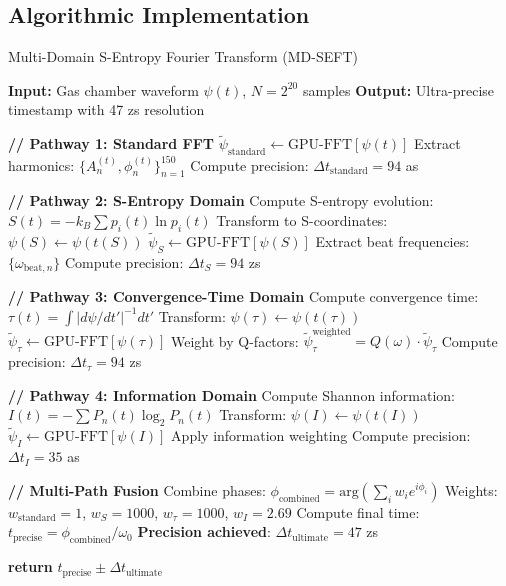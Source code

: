 \documentclass[12pt,a4paper]{article}
\begin{document}
\subsection{Algorithmic Implementation}

\begin{algorithm}[H]
\caption{Multi-Domain S-Entropy Fourier Transform (MD-SEFT)}
\begin{algorithmic}[1]
\State \textbf{Input:} Gas chamber waveform $\psi(t)$, $N = 2^{20}$ samples
\State \textbf{Output:} Ultra-precise timestamp with 47 zs resolution

\State \textbf{// Pathway 1: Standard FFT}
\State $\tilde{\psi}_{\text{standard}} \gets \text{GPU-FFT}[\psi(t)]$
\State Extract harmonics: $\{A_n^{(t)}, \phi_n^{(t)}\}_{n=1}^{150}$
\State Compute precision: $\Delta t_{\text{standard}} = 94$ as

\State \textbf{// Pathway 2: S-Entropy Domain}
\State Compute S-entropy evolution: $S(t) = -k_B \sum p_i(t) \ln p_i(t)$
\State Transform to S-coordinates: $\psi(S) \gets \psi(t(S))$
\State $\tilde{\psi}_S \gets \text{GPU-FFT}[\psi(S)]$
\State Extract beat frequencies: $\{\omega_{\text{beat},n}\}$
\State Compute precision: $\Delta t_S = 94$ zs

\State \textbf{// Pathway 3: Convergence-Time Domain}
\State Compute convergence time: $\tau(t) = \int |d\psi/dt'|^{-1} dt'$
\State Transform: $\psi(\tau) \gets \psi(t(\tau))$
\State $\tilde{\psi}_{\tau} \gets \text{GPU-FFT}[\psi(\tau)]$
\State Weight by Q-factors: $\tilde{\psi}_{\tau}^{\text{weighted}} = Q(\omega) \cdot \tilde{\psi}_{\tau}$
\State Compute precision: $\Delta t_{\tau} = 94$ zs

\State \textbf{// Pathway 4: Information Domain}
\State Compute Shannon information: $I(t) = -\sum P_n(t) \log_2 P_n(t)$
\State Transform: $\psi(I) \gets \psi(t(I))$
\State $\tilde{\psi}_I \gets \text{GPU-FFT}[\psi(I)]$
\State Apply information weighting
\State Compute precision: $\Delta t_I = 35$ as

\State \textbf{// Multi-Path Fusion}
\State Combine phases: $\phi_{\text{combined}} = \text{arg}\left(\sum_{i} w_i e^{i\phi_i}\right)$
\State Weights: $w_{\text{standard}} = 1$, $w_S = 1000$, $w_{\tau} = 1000$, $w_I = 2.69$
\State Compute final time: $t_{\text{precise}} = \phi_{\text{combined}}/\omega_0$
\State \textbf{Precision achieved}: $\Delta t_{\text{ultimate}} = 47$ zs

\State \textbf{return} $t_{\text{precise}} \pm \Delta t_{\text{ultimate}}$
\end{algorithmic}
\end{algorithm}
\end{document}
